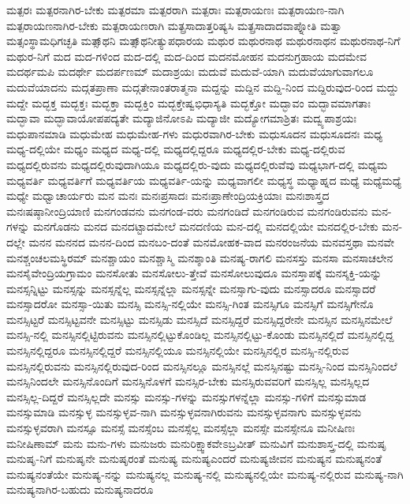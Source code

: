 {ಮತ್ಪರಃ
ಮತ್ಪರನಾಗಿರ-ಬೇಕು
ಮತ್ಪರಮಾ
ಮತ್ಪರರಾಗಿ
ಮತ್ಪರಾಃ
ಮತ್ಪರಾಯಣಃ
ಮತ್ಪರಾಯಣ-ನಾಗಿ
ಮತ್ಪರಾಯಣನಾಗಿರ-ಬೇಕು
ಮತ್ಪರಾಯಣರಾಗಿ
ಮತ್ಪ್ರಸಾದಾತ್ತರಿಷ್ಯಸಿ
ಮತ್ಪ್ರಸಾದಾದವಾಪ್ನೋತಿ
ಮತ್ವಾ
ಮತ್ಸಂಸ್ಥಾಮಧಿಗಚ್ಛತಿ
ಮತ್ಸಾ್ಥನಿ
ಮತ್ಸಾ್ಥನೀತ್ಯುಪಧಾರಯ
ಮಥುರ
ಮಥುರನಾಥ
ಮಥುರನಾಥನ
ಮಥುರನಾಥ-ನಿಗೆ
ಮಥುರ-ನಿಗೆ
ಮದ
ಮದ-ಗಳಿಂದ
ಮದ-ದಲ್ಲಿ
ಮದ-ದಿಂದ
ಮದನಮೋಹನ
ಮದನುಗ್ರಹಾಯ
ಮದಮೇವ
ಮದರ್ಥಮಪಿ
ಮದರ್ಥೇ
ಮದರ್ಪಣಮ್
ಮದಾಶ್ರಯಃ
ಮದುವೆ
ಮದುವೆ-ಯಾಗಿ
ಮದುವೆಯಾಗುವಾಗಲೂ
ಮದುವೆಯಾದನು
ಮದ್ಗತಪ್ರಾಣಾ
ಮದ್ಗತೇನಾಂತರಾತ್ಮನಾ
ಮದ್ದನ್ನು
ಮದ್ದಿನ
ಮದ್ದಿ-ನಿಂದ
ಮದ್ದಿರುವುದ-ರಿಂದ
ಮದ್ದು
ಮದ್ದೇ
ಮದ್ಭಕ್ತ
ಮದ್ಭಕ್ತಃ
ಮದ್ಭಕ್ತಾ
ಮದ್ಭಕ್ತಿಂ
ಮದ್ಭಕ್ತೇಷ್ವಭಿಧಾಸ್ಯತಿ
ಮದ್ಭಕ್ತೋ
ಮದ್ಭಾವಂ
ಮದ್ಭಾವಮಾಗತಾಃ
ಮದ್ಭಾವಾ
ಮದ್ಭಾವಾಯೋಪಪದ್ಯತೇ
ಮದ್ಯಾಜಿನೋಽಪಿ
ಮದ್ಯಾಜೀ
ಮದ್ಯೋಗಮಾಶ್ರಿತಃ
ಮದ್ವ್ಯಪಾಶ್ರಯಃ
ಮಧುಪಾನಮಾಡಿ
ಮಧುಮೇಹ
ಮಧುಮೇಹ-ಗಳು
ಮಧುರವಾಗಿರ-ಬೇಕು
ಮಧುಸೂದನ
ಮಧುಸೂದನಃ
ಮಧ್ಯ
ಮಧ್ಯ-ದಲ್ಲಿಯೇ
ಮಧ್ಯಂ
ಮಧ್ಯದ
ಮಧ್ಯ-ದಲ್ಲಿ
ಮಧ್ಯದಲ್ಲಿದ್ದರೂ
ಮಧ್ಯದಲ್ಲಿರ-ಬೇಕು
ಮಧ್ಯ-ದಲ್ಲಿರುವ
ಮಧ್ಯದಲ್ಲಿರುವನು
ಮಧ್ಯದಲ್ಲಿರುವುದಾಗಿಯೂ
ಮಧ್ಯದಲ್ಲಿರು-ವುದು
ಮಧ್ಯದಲ್ಲಿರುವೆವು
ಮಧ್ಯಭಾಗ-ದಲ್ಲಿ
ಮಧ್ಯಮ
ಮಧ್ಯವರ್ತಿ
ಮಧ್ಯವರ್ತಿಗೆ
ಮಧ್ಯವರ್ತಿಯ
ಮಧ್ಯವರ್ತಿ-ಯನ್ನು
ಮಧ್ಯವಾಗಲೀ
ಮಧ್ಯಸ್ಥ
ಮಧ್ಯಾಹ್ನದ
ಮಧ್ಯೆ
ಮಧ್ಯೆಮಧ್ಯೆ
ಮಧ್ಯೇ
ಮಧ್ವಾಚಾರ್ಯರು
ಮನ
ಮನಃ
ಮನಃಪ್ರಸಾದಃ
ಮನಃಪ್ರಾಣೇಂದ್ರಿಯಕ್ರಿಯಾಃ
ಮನಃಶಾಸ್ತ್ರದ
ಮನಃಷಷ್ಠಾನೀಂದ್ರಿಯಾಣಿ
ಮನಗಂಡವನು
ಮನಗಂಡ-ವರು
ಮನಗಂಡಿದೆ
ಮನಗಂಡಿರುವ
ಮನಗಂಡಿರುವನು
ಮನ-ಗಳನ್ನು
ಮನಗೊಡನು
ಮನದ
ಮನದಟ್ಟಾದಮೇಲೆ
ಮನದಣಿಯ
ಮನ-ದಲ್ಲಿ
ಮನದಲ್ಲಿಯೇ
ಮನದಲ್ಲಿರ-ಬೇಕು
ಮನ-ದಲ್ಲೇ
ಮನನ
ಮನನದ
ಮನನ-ದಿಂದ
ಮನಬಂ-ದಂತೆ
ಮನಮೋಹಕ-ವಾದ
ಮನರಂಜನೆಯ
ಮನವಸ್ತಥಾ
ಮನವೇ
ಮನಶ್ಚಂಚಲಮಸ್ಥಿರಮ್
ಮನಶ್ಚಾಯಂ
ಮನಶ್ಚಾಸ್ಮಿ
ಮನಶ್ಶಾಂತಿ
ಮನಷ್ಯ-ರಾಗಲಿ
ಮನಸಸ್ತು
ಮನಸಾ
ಮನಸಾಚಲೇನ
ಮನಸೈವೇಂದ್ರಿಯಗ್ರಾಮಂ
ಮನಸೋತು
ಮನಸೋಲು-ತ್ತೇವೆ
ಮನಸೋಲುವುದೂ
ಮನಸ್ತಾಪಕ್ಕೆ
ಮನಸ್ಶಕ್ತಿ-ಯನ್ನು
ಮನಸ್ಸನ್ನಿಟ್ಟು
ಮನಸ್ಸನ್ನು
ಮನಸ್ಸನ್ನೆಲ್ಲ
ಮನಸ್ಸನ್ನೆಲ್ಲಾ
ಮನಸ್ಸನ್ನೇ
ಮನಸ್ಸಾಗು-ವುದು
ಮನಸ್ಸಾದರೂ
ಮನಸ್ಸಾದರೆ
ಮನಸ್ಸಾದರೋ
ಮನಸ್ಸಾ-ಯಿತು
ಮನಸ್ಸಿ
ಮನಸ್ಸಿ-ನಲ್ಲಿಯೇ
ಮನಸ್ಸಿ-ಗಿಂತ
ಮನಸ್ಸಿಗೂ
ಮನಸ್ಸಿಗೆ
ಮನಸ್ಸಿಗೇನೊ
ಮನಸ್ಸಿಟ್ಟರೆ
ಮನಸ್ಸಿಟ್ಟವನೇ
ಮನಸ್ಸಿಟ್ಟು
ಮನಸ್ಸಿಡು
ಮನಸ್ಸಿದೆ
ಮನಸ್ಸಿದ್ದರೆ
ಮನಸ್ಸಿದ್ದರೇನೇ
ಮನಸ್ಸಿನ
ಮನಸ್ಸಿನಮೇಲೆ
ಮನಸ್ಸಿ-ನಲ್ಲಿ
ಮನಸ್ಸಿನಲ್ಲಿಟ್ಟಿರುವನು
ಮನಸ್ಸಿನಲ್ಲಿಟ್ಟುಕೊಂಡಿಲ್ಲ
ಮನಸ್ಸಿನಲ್ಲಿಟ್ಟು-ಕೊಂಡು
ಮನಸ್ಸಿನಲ್ಲಿದೆ
ಮನಸ್ಸಿನಲ್ಲಿದ್ದ
ಮನಸ್ಸಿನಲ್ಲಿದ್ದರೂ
ಮನಸ್ಸಿನಲ್ಲಿದ್ದರೆ
ಮನಸ್ಸಿನಲ್ಲಿಯೂ
ಮನಸ್ಸಿನಲ್ಲಿಯೇ
ಮನಸ್ಸಿನಲ್ಲಿರ
ಮನಸ್ಸಿ-ನಲ್ಲಿರುವ
ಮನಸ್ಸಿನಲ್ಲಿರುವನು
ಮನಸ್ಸಿನಲ್ಲಿರುವುದ-ರಿಂದ
ಮನಸ್ಸಿನಲ್ಲೂ
ಮನಸ್ಸಿನಲ್ಲೆ
ಮನಸ್ಸಿನಷ್ಟು
ಮನಸ್ಸಿ-ನಿಂದ
ಮನಸ್ಸಿನಿಂದಲೆ
ಮನಸ್ಸಿನಿಂದಲೇ
ಮನಸ್ಸಿನೊಂದಿಗೆ
ಮನಸ್ಸಿನೊಳಗೆ
ಮನಸ್ಸಿರ-ಬೇಕು
ಮನಸ್ಸಿರುವವರಿಗೆ
ಮನಸ್ಸಿಲ್ಲ
ಮನಸ್ಸಿಲ್ಲದ
ಮನಸ್ಸಿಲ್ಲ-ದಿದ್ದರೆ
ಮನಸ್ಸಿಲ್ಲದೇ
ಮನಸ್ಸು
ಮನಸ್ಸು-ಗಳನ್ನು
ಮನಸ್ಸುಗಳನ್ನೆಲ್ಲಾ
ಮನಸ್ಸು-ಗಳಿಗೆ
ಮನಸ್ಸುಮಾಡ
ಮನಸ್ಸುಮಾಡಿ
ಮನಸ್ಸುಳ್ಳ
ಮನಸ್ಸುಳ್ಳವ-ನಾಗಿ
ಮನಸ್ಸುಳ್ಳವನಾಗಿರುವನು
ಮನಸ್ಸುಳ್ಳವನಾಗು
ಮನಸ್ಸುಳ್ಳವನು
ಮನಸ್ಸುಳ್ಳವರಾಗಿ
ಮನಸ್ಸೂ
ಮನಸ್ಸೆ
ಮನಸ್ಸೆಂಬ
ಮನಸ್ಸೆಲ್ಲ
ಮನಸ್ಸೆಲ್ಲಾ
ಮನಸ್ಸೇ
ಮನಸ್ಸೇನೂ
ಮನೀಷಿಣಃ
ಮನೀಷಿಣಾಮ್
ಮನು
ಮನು-ಗಳು
ಮನುಜರು
ಮನುರಿಕ್ಷ್ವಾಕವೇಽಬ್ರವೀತ್
ಮನುವಿಗೆ
ಮನುಶಾಸ್ತ್ರ-ದಲ್ಲಿ
ಮನುಷೃ
ಮನುಷೃ-ನಿಗೆ
ಮನುಷೃನೇ
ಮನುಷೃರಂತೆ
ಮನುಷ್ಯ
ಮನುಷ್ಯಎಂದರೆ
ಮನುಷ್ಯಜೀವನ
ಮನುಷ್ಯನ
ಮನುಷ್ಯನಂತೆ
ಮನುಷ್ಯನಂತೆಯೇ
ಮನುಷ್ಯ-ನನ್ನು
ಮನುಷ್ಯನಲ್ಲ
ಮನುಷ್ಯ-ನಲ್ಲಿ
ಮನುಷ್ಯನಲ್ಲಿಯೇ
ಮನುಷ್ಯ-ನಲ್ಲಿರುವ
ಮನುಷ್ಯ-ನಾಗಿ
ಮನುಷ್ಯನಾಗಿರ-ಬಹುದು
ಮನುಷ್ಯನಾದರೂ
}
